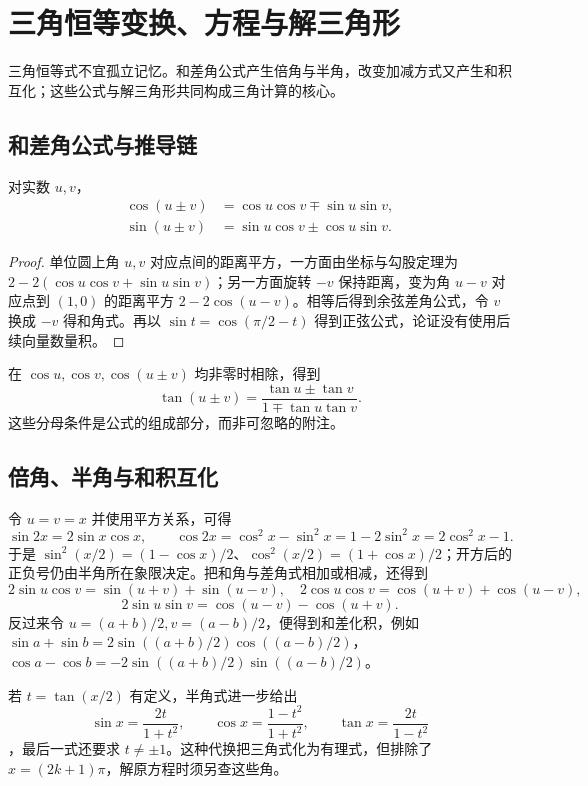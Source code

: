 \setcounter{chapter}{17} %
\chapter{三角恒等变换、方程与解三角形}
\label{chap:em-triangle-solving}
三角恒等式不宜孤立记忆。和差角公式产生倍角与半角，改变加减方式又产生和积互化；这些公式与解三角形共同构成三角计算的核心。

\section{和差角公式与推导链}
\begin{theorem}[和差角公式]
对实数 $u,v$，
\begin{align}
 \cos(u\pm v)&=\cos u\cos v\mp\sin u\sin v,\label{eq:em-cos-add}\\
 \sin(u\pm v)&=\sin u\cos v\pm\cos u\sin v.\label{eq:em-sin-add}
\end{align}
\end{theorem}
\begin{proof}
单位圆上角 $u,v$ 对应点间的距离平方，一方面由坐标与勾股定理为 $2-2(\cos u\cos v+\sin u\sin v)$；另一方面旋转 $-v$ 保持距离，变为角 $u-v$ 对应点到 $(1,0)$ 的距离平方 $2-2\cos(u-v)$。相等后得到余弦差角公式，令 $v$ 换成 $-v$ 得和角式。再以 $\sin t=\cos(\pi/2-t)$ 得到正弦公式，论证没有使用后续向量数量积。
\end{proof}
在 $\cos u,\cos v,\cos(u\pm v)$ 均非零时相除，得到
\[
 \tan(u\pm v)=\frac{\tan u\pm\tan v}{1\mp\tan u\tan v}.
\]
这些分母条件是公式的组成部分，而非可忽略的附注。

\section{倍角、半角与和积互化}
令 $u=v=x$ 并使用平方关系，可得
\[
 \sin2x=2\sin x\cos x,\qquad
 \cos2x=\cos^2x-\sin^2x=1-2\sin^2x=2\cos^2x-1.
\]
于是 $\sin^2(x/2)=(1-\cos x)/2$、$\cos^2(x/2)=(1+\cos x)/2$；开方后的正负号仍由半角所在象限决定。把和角与差角式相加或相减，还得到
\[
 2\sin u\cos v=\sin(u+v)+\sin(u-v),\quad
 2\cos u\cos v=\cos(u+v)+\cos(u-v),
\]
\[
 2\sin u\sin v=\cos(u-v)-\cos(u+v).
\]
反过来令 $u=(a+b)/2,v=(a-b)/2$，便得到和差化积，例如
$\sin a+\sin b=2\sin((a+b)/2)\cos((a-b)/2)$，
$\cos a-\cos b=-2\sin((a+b)/2)\sin((a-b)/2)$。

若 $t=\tan(x/2)$ 有定义，半角式进一步给出
\[
 \sin x=\frac{2t}{1+t^2},\qquad
 \cos x=\frac{1-t^2}{1+t^2},\qquad
 \tan x=\frac{2t}{1-t^2}
\]
，最后一式还要求 $t\ne\pm1$。这种代换把三角式化为有理式，但排除了 $x=(2k+1)\pi$，解原方程时须另查这些角。

